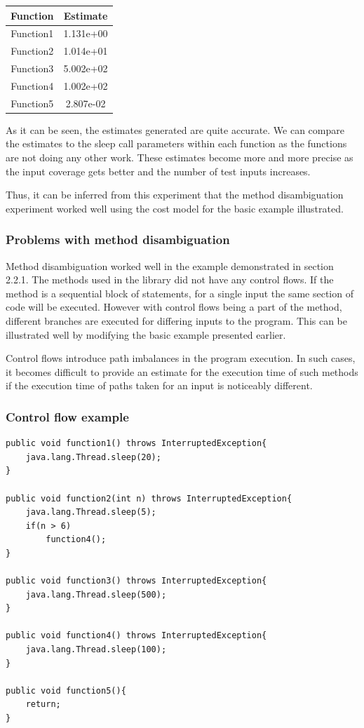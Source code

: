 \documentclass[11pt]{article}
\begin{document}
\begin{center}
\begin{tabular}{|c|c|}
\hline
Function&Estimate\\
\hline
Function1&1.131e+00  \\
Function2&1.014e+01  \\
Function3&5.002e+02  \\
Function4&1.002e+02  \\
Function5&2.807e-02  \\
\hline
\end{tabular}
\end{center}

As it can be seen, the estimates generated are quite accurate. We can compare the estimates to the sleep call parameters within each function as the functions are not doing any other work. These estimates become more and more precise as the input coverage gets better and the number of test inputs increases. \newline

Thus, it can be inferred from this experiment that the method disambiguation experiment worked well using the cost model for the basic example illustrated. 

\subsubsection{Problems with method disambiguation}
Method disambiguation worked well in the example demonstrated in section 2.2.1. The methods used in the library did not have any control flows. If the method is a sequential block of statements, for a single input the same section of code will be executed. However with control flows being a part of the method, different branches are executed for differing inputs to the program. This can be illustrated well by modifying the basic example presented earlier.\newline

Control flows introduce path imbalances in the program execution. In such cases, it becomes difficult to provide an estimate for the execution time of such methods if the  execution time of paths taken for an input is noticeably different.

\subsubsection{Control flow example}
\begin{lstlisting}
public void function1() throws InterruptedException{
	java.lang.Thread.sleep(20);
}
	
public void function2(int n) throws InterruptedException{
	java.lang.Thread.sleep(5);
	if(n > 6)
		function4();	
}
	
public void function3() throws InterruptedException{
	java.lang.Thread.sleep(500);
}
	
public void function4() throws InterruptedException{	
	java.lang.Thread.sleep(100);
}
	
public void function5(){
	return;
}
\end{lstlisting}
\end{document}
